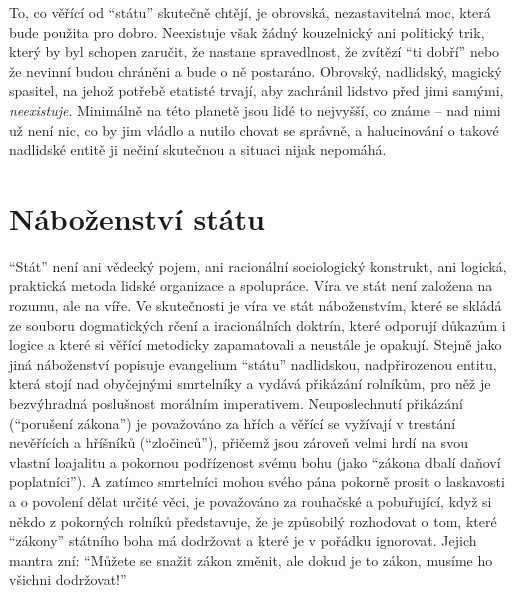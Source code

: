 \documentclass{book}
\begin{document}
To, co věřící od \enquote{státu} skutečně chtějí, je obrovská, nezastavitelná moc, která bude použita pro dobro. Neexistuje však žádný kouzelnický ani politický trik, který by byl schopen zaručit, že nastane spravedlnost, že zvítězí \enquote{ti dobří} nebo že nevinní budou chráněni a bude o ně postaráno. Obrovský, nadlidský, magický spasitel, na jehož potřebě etatisté trvají, aby zachránil lidstvo před jimi samými, \emph{neexistuje}. Minimálně na této planetě jsou lidé to nejvyšší, co známe -- nad nimi už není nic, co by jim vládlo a nutilo chovat se správně, a halucinování o takové nadlidské entitě ji nečiní skutečnou a situaci nijak nepomáhá.

\section{Náboženství státu}

\enquote{Stát} není ani vědecký pojem, ani racionální sociologický konstrukt, ani logická, praktická metoda lidské organizace a spolupráce. Víra ve stát není založena na rozumu, ale na víře. Ve skutečnosti je víra ve stát náboženstvím, které se skládá ze souboru dogmatických rčení a iracionálních doktrín, které odporují důkazům i logice a které si věřící metodicky zapamatovali a neustále je opakují. Stejně jako jiná náboženství popisuje evangelium \enquote{státu} nadlidskou, nadpřirozenou entitu, která stojí nad obyčejnými smrtelníky a vydává přikázání rolníkům, pro něž je bezvýhradná poslušnost morálním imperativem. Neuposlechnutí přikázání (\enquote{porušení zákona}) je považováno za hřích a věřící se vyžívají v trestání nevěřících a hříšníků (\enquote{zločinců}), přičemž jsou zároveň velmi hrdí na svou vlastní loajalitu a pokornou podřízenost svému bohu (jako \enquote{zákona dbalí daňoví poplatníci}). A zatímco smrtelníci mohou svého pána pokorně prosit o laskavosti a o povolení dělat určité věci, je považováno za rouhačské a pobuřující, když si někdo z pokorných rolníků představuje, že je způsobilý rozhodovat o tom, které \enquote{zákony} státního boha má dodržovat a které je v pořádku ignorovat. Jejich mantra zní: \enquote{Můžete se snažit zákon změnit, ale dokud je to zákon, musíme ho všichni dodržovat!}
\end{document}
